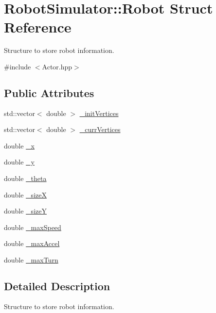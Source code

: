 \hypertarget{structRobotSimulator_1_1Robot}{\section{Robot\-Simulator\-:\-:Robot Struct Reference}
\label{structRobotSimulator_1_1Robot}
}


Structure to store robot information.  




{\ttfamily \#include $<$Actor.\-hpp$>$}

\subsection*{Public Attributes}
\begin{DoxyCompactItemize}
\item 
std\-::vector$<$ double $>$ \hyperlink{structRobotSimulator_1_1Robot_ab7ac2c4dd487006e5e563ad0341808fb}{\-\_\-init\-Vertices}
\item 
std\-::vector$<$ double $>$ \hyperlink{structRobotSimulator_1_1Robot_acc4b3b442e3739589a5b7a3597988df2}{\-\_\-curr\-Vertices}
\item 
double \hyperlink{structRobotSimulator_1_1Robot_ab86590932e31a8a7aad72e0173b8c0e8}{\-\_\-x}
\item 
double \hyperlink{structRobotSimulator_1_1Robot_a0b386e0cb1fcdbb0ed0fd0a42d362165}{\-\_\-y}
\item 
double \hyperlink{structRobotSimulator_1_1Robot_a9c91ff0ff4514da0c9cd56f45064032e}{\-\_\-theta}
\item 
double \hyperlink{structRobotSimulator_1_1Robot_afc7eddc29b81662393361dc8ca24806a}{\-\_\-size\-X}
\item 
double \hyperlink{structRobotSimulator_1_1Robot_a15d2779576df86d973c42c12c1f3c2ba}{\-\_\-size\-Y}
\item 
double \hyperlink{structRobotSimulator_1_1Robot_a25f9d011ee0c6952950b63405286438b}{\-\_\-max\-Speed}
\item 
double \hyperlink{structRobotSimulator_1_1Robot_a34048992e382edb88e15cbee3741e7ed}{\-\_\-max\-Accel}
\item 
double \hyperlink{structRobotSimulator_1_1Robot_af9967fd4b2e74e67e5b9d3bc45fd30d3}{\-\_\-max\-Turn}
\end{DoxyCompactItemize}


\subsection{Detailed Description}
Structure to store robot information. 

